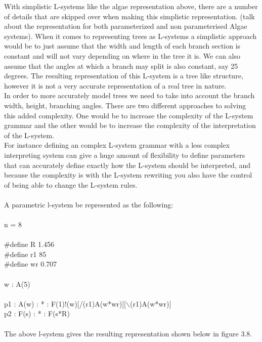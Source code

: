 With simplistic L-systems like the algae representation above, there are a number of details that are skipped over when making this simplistic representation. (talk about the representation for both parameterized and non parameterised Algae systems). When it comes to representing trees as L-systems a simplistic approach would be to just assume that the width and length of each branch section is constant and will not vary depending on where in the tree it is. We can also assume that the angles at which a branch may split is also constant, say 25 degrees. 
The resulting representation of this L-system is a tree like structure, however it is not a very accurate representation of a real tree in nature. \\
In order to more accurately model trees we need to take into account the branch width, height, branching angles. There are two different approaches to solving this added complexity. One would be to increase the complexity of the L-system grammar and the other would be to increase the complexity of the interpretation of the L-system. \\
For instance defining an complex L-system grammar with a less complex interpreting system can give a huge amount of flexibility to define parameters that can accurately define exactly how the L-system should be interpreted, and because the complexity is with the L-system rewriting you also have the control of being able to change the L-system rules. \\
\\ 
A parametric l-system be represented as the following: \\
\\
\hspace*{3cm} n = 8\\
\\
\hspace*{3cm} \#define R 1.456\\
\hspace*{3cm} \#define r1 85\\
\hspace*{3cm} \#define wr 0.707\\
\\
\hspace*{3cm} w : A(5)\\
\\
\hspace*{3cm} p1 : A(w) : * : F(1)!(w)[/(r1)A(w*wr)][$\backslash$(r1)A(w*wr)]\\
\hspace*{3cm} p2 : F(s) : * : F(s*R)\\
\\
The above l-system gives the resulting representation shown below in figure 3.8. 

